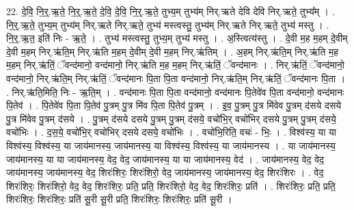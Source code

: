 \documentclass[17pt]{extarticle}
\begin{document}
22. दे॒वि॒ नि॒र्॒.ऋ॒ते॒ नि॒र्॒.ऋ॒ते॒ दे॒वि॒ दे॒वि॒ नि॒र्॒.ऋ॒ते॒ तुभ्य॒म् तुभ्य॑म् निर्.ऋते देवि देवि निर्.ऋते॒ तुभ्य᳚म् । . नि॒र्॒.ऋ॒ते॒ तुभ्य॒म् तुभ्य॑म् निर्.ऋते निर्.ऋते॒ तुभ्य॑ मस्त्वस्तु॒ तुभ्य॑म् निर्.ऋते निर्.ऋते॒ तुभ्य॑ मस्तु । . नि॒र्॒.ऋ॒त॒ इति॑ निः - ऋ॒ते॒ । . तुभ्य॑ मस्त्वस्तु॒ तुभ्य॒म् तुभ्य॑ मस्तु । . अ॒स्त्वित्य॑स्तु । . दे॒वी म॒ह म॒हम् दे॒वीम् दे॒वी म॒हम् निर्.ऋ॑ति॒म् निर्.ऋ॑ति म॒हम् दे॒वीम् दे॒वी म॒हम् निर्.ऋ॑तिम् । . अ॒हम् निर्.ऋ॑ति॒म् निर्.ऋ॑ति म॒ह म॒हम् निर्.ऋ॑तिं॒ ॅवन्द॑मानो॒ वन्द॑मानो॒ निर्.ऋ॑ति म॒ह म॒हम् निर्.ऋ॑तिं॒ ॅवन्द॑मानः । . निर्.ऋ॑तिं॒ ॅवन्द॑मानो॒ वन्द॑मानो॒ निर्.ऋ॑ति॒म् निर्.ऋ॑तिं॒ ॅवन्द॑मानः पि॒ता पि॒ता वन्द॑मानो॒ निर्.ऋ॑ति॒म् निर्.ऋ॑तिं॒ ॅवन्द॑मानः पि॒ता । . निर्.ऋ॑ति॒मिति॒ निः - ऋ॒ति॒म् । . वन्द॑मानः पि॒ता पि॒ता वन्द॑मानो॒ वन्द॑मानः पि॒तेवे॑व पि॒ता वन्द॑मानो॒ वन्द॑मानः पि॒तेव॑ । . पि॒तेवे॑व पि॒ता पि॒तेव॑ पु॒त्रम् पु॒त्र मि॑व पि॒ता पि॒तेव॑ पु॒त्रम् । . इ॒व॒ पु॒त्रम् पु॒त्र मि॑वेव पु॒त्रम् द॑सये दसये पु॒त्र मि॑वेव पु॒त्रम् द॑सये । . पु॒त्रम् द॑सये दसये पु॒त्रम् पु॒त्रम् द॑सये॒ वचो॑भि॒र् वचो॑भिर् दसये पु॒त्रम् पु॒त्रम् द॑सये॒ वचो॑भिः । . द॒स॒ये॒ वचो॑भि॒र् वचो॑भिर् दसये दसये॒ वचो॑भिः । . वचो॑भि॒रिति॒ वचः॑ - भिः॒ । . विश्व॑स्य॒ या या विश्व॑स्य॒ विश्व॑स्य॒ या जाय॑मानस्य॒ जाय॑मानस्य॒ या विश्व॑स्य॒ विश्व॑स्य॒ या जाय॑मानस्य । . या जाय॑मानस्य॒ जाय॑मानस्य॒ या या जाय॑मानस्य॒ वेद॒ वेद॒ जाय॑मानस्य॒ या या जाय॑मानस्य॒ वेद॑ । . जाय॑मानस्य॒ वेद॒ वेद॒ जाय॑मानस्य॒ जाय॑मानस्य॒ वेद॒ शिरः॑शिरः॒ शिरः॑शिरो॒ वेद॒ जाय॑मानस्य॒ जाय॑मानस्य॒ वेद॒ शिरः॑शिरः । . वेद॒ शिरः॑शिरः॒ शिरः॑शिरो॒ वेद॒ वेद॒ शिरः॑शिरः॒ प्रति॒ प्रति॒ शिरः॑शिरो॒ वेद॒ वेद॒ शिरः॑शिरः॒ प्रति॑ । . शिरः॑शिरः॒ प्रति॒ प्रति॒ शिरः॑शिरः॒ शिरः॑शिरः॒ प्रति॑ सू॒री सू॒री प्रति॒ शिरः॑शिरः॒ शिरः॑शिरः॒ प्रति॑ सू॒री । \newline
\end{document}

